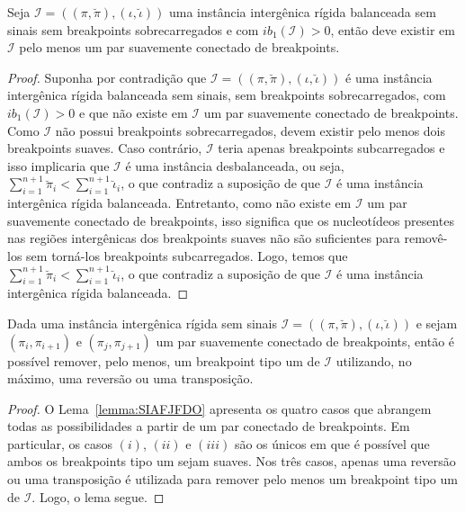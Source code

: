 \begin{lemma}\label{lemma:GZNXMCLB}
Seja $\mathcal{I} = ((\pi,\breve\pi),(\iota,\breve\iota))$ uma instância intergênica rígida balanceada sem sinais sem breakpoints sobrecarregados e com $ib_1(\mathcal{I}) > 0$, então deve existir em $\mathcal{I}$ pelo menos um par suavemente conectado de breakpoints.
\end{lemma}
\begin{proof}
Suponha por contradição que $\mathcal{I}=((\pi,\breve\pi),(\iota,\breve\iota))$ é uma instância intergênica rígida balanceada sem sinais, sem breakpoints sobrecarregados, com $ib_1(\mathcal{I}) > 0$ e que não existe em  $\mathcal{I}$ um par suavemente conectado de breakpoints. Como $\mathcal{I}$ não possui breakpoints sobrecarregados, devem existir pelo menos dois breakpoints suaves. Caso contrário, $\mathcal{I}$ teria apenas breakpoints subcarregados e isso implicaria que $\mathcal{I}$ é uma instância desbalanceada, ou seja, $\sum_{i=1}^{n+1}\breve\pi_i < \sum_{i=1}^{n+1}\breve\iota_i$, o que contradiz a suposição de que $\mathcal{I}$ é uma instância intergênica rígida balanceada. Entretanto, como não existe em  $\mathcal{I}$ um par suavemente conectado de breakpoints, isso significa que os nucleotídeos presentes nas regiões intergênicas dos breakpoints suaves não são suficientes para removê-los sem torná-los breakpoints subcarregados. Logo, temos que $\sum_{i=1}^{n+1}\breve\pi_i < \sum_{i=1}^{n+1}\breve\iota_i$, o que contradiz a suposição de que $\mathcal{I}$ é uma instância intergênica rígida balanceada.
\end{proof}

\begin{lemma}\label{lemma:LRCEAVRZ}
Dada uma instância intergênica rígida sem sinais $\mathcal{I}=((\pi,\breve\pi),(\iota,\breve\iota))$ e sejam $(\pi_i,\pi_{i+1})$ e $(\pi_j,\pi_{j+1})$ um par suavemente conectado de breakpoints, então é possível remover, pelo menos, um breakpoint tipo um de $\mathcal{I}$ utilizando, no máximo, uma reversão ou uma transposição.
\end{lemma}
\begin{proof}
O Lema~\ref{lemma:SIAFJFDO} apresenta os quatro casos que abrangem todas as possibilidades a partir de um par conectado de breakpoints. Em particular, os casos $(i)$, $(ii)$ e $(iii)$ são os únicos em que é possível que ambos os breakpoints tipo um sejam suaves. Nos três casos, apenas uma reversão ou uma transposição é utilizada para remover pelo menos um breakpoint tipo um de $\mathcal{I}$. Logo, o lema segue.
\end{proof}


